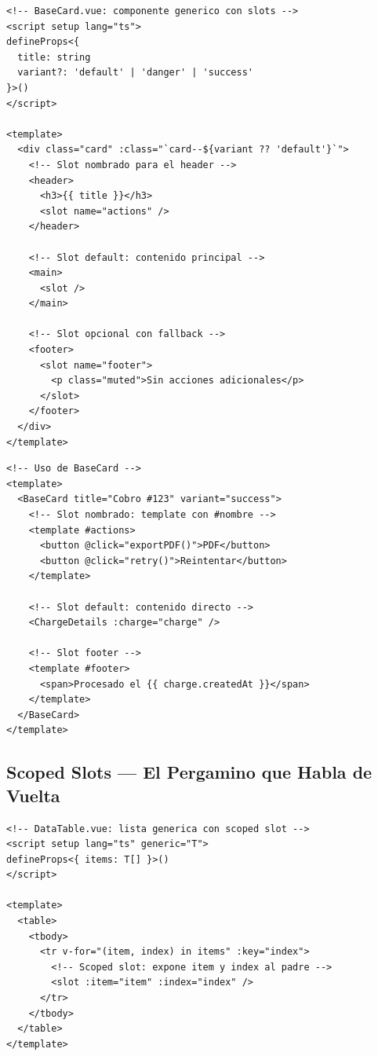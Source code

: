 \documentclass[11pt,a4paper]{article}
\begin{document}
\begin{pergamino}
\begin{lstlisting}[style=vue]
<!-- BaseCard.vue: componente generico con slots -->
<script setup lang="ts">
defineProps<{
  title: string
  variant?: 'default' | 'danger' | 'success'
}>()
</script>

<template>
  <div class="card" :class="`card--${variant ?? 'default'}`">
    <!-- Slot nombrado para el header -->
    <header>
      <h3>{{ title }}</h3>
      <slot name="actions" />
    </header>

    <!-- Slot default: contenido principal -->
    <main>
      <slot />
    </main>

    <!-- Slot opcional con fallback -->
    <footer>
      <slot name="footer">
        <p class="muted">Sin acciones adicionales</p>
      </slot>
    </footer>
  </div>
</template>
\end{lstlisting}
\end{pergamino}

\begin{pergamino}
\begin{lstlisting}[style=vue]
<!-- Uso de BaseCard -->
<template>
  <BaseCard title="Cobro #123" variant="success">
    <!-- Slot nombrado: template con #nombre -->
    <template #actions>
      <button @click="exportPDF()">PDF</button>
      <button @click="retry()">Reintentar</button>
    </template>

    <!-- Slot default: contenido directo -->
    <ChargeDetails :charge="charge" />

    <!-- Slot footer -->
    <template #footer>
      <span>Procesado el {{ charge.createdAt }}</span>
    </template>
  </BaseCard>
</template>
\end{lstlisting}
\end{pergamino}

\subsection{Scoped Slots — El Pergamino que Habla de Vuelta}

\begin{pergamino}
\begin{lstlisting}[style=vue]
<!-- DataTable.vue: lista generica con scoped slot -->
<script setup lang="ts" generic="T">
defineProps<{ items: T[] }>()
</script>

<template>
  <table>
    <tbody>
      <tr v-for="(item, index) in items" :key="index">
        <!-- Scoped slot: expone item y index al padre -->
        <slot :item="item" :index="index" />
      </tr>
    </tbody>
  </table>
</template>
\end{lstlisting}
\end{pergamino}
\end{document}
